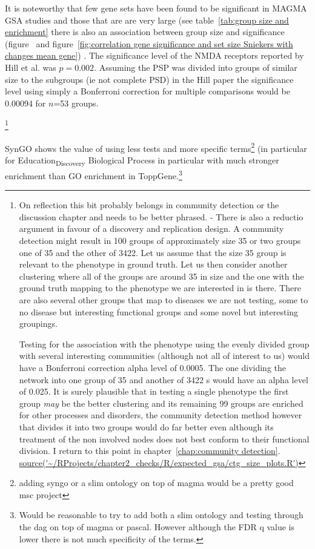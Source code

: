 It is noteworthy that few gene sets have been found to be significant in MAGMA GSA studies and those that are are very large (see table~\ref{tab:group size and enrichment} there is also an association between group size and significance (figure~\label{fig:correlation gene significance and set size Sniekers} and figure~\ref{fig:correlation gene significance and set size Sniekers with changes mean gene}) . The significance level of the NMDA receptors reported by Hill et al. \cite{hill2014human} was $p=0.002$. Assuming the PSP was divided into groups of similar size to the subgroups (ie not complete PSD) in the Hill paper the significance level using simply a Bonferroni correction for multiple comparisons would be  0.00094 for $n$=53 groups. 


\footnote{On reflection this bit probably belongs in community detection or the discussion chapter and needs to be better phrased. - There is also a reductio argument in favour of a discovery and replication design.  A community detection might result in 100 groups of approximately size 35 or two groups one of 35 and the other of 3422. Let us assume that the size 35 group is relevant to the phenotype in ground truth. Let us then consider another clustering where all of the groups are around 35 in size and the one with the ground truth mapping to the phenotype we are interested in is there. There are also several other groups that map to diseases we are not testing, some to no disease but interesting functional groups and some novel but interesting groupings. 

Testing for the association with the phenotype using the evenly divided group with several interesting communities (although not all of interest to us)  would have a Bonferroni correction alpha level of 0.0005. The one dividing the network into one group of 35 and another of 3422 s would have an alpha level of 0.025. It is surely plausible that in testing a single phenotype the first group \textit{may} be the better clustering and its remaining 99 groups are enriched for other processes and disorders, the community detection method however that divides it into two groups would do far better even although its treatment of the non involved nodes does not best conform to their functional division. I return to this point in chapter~\ref{chap:community detection}.
\url{ source('~/RProjects/chapter2_checks/R/expected_gsa/ctg_size_plots.R')}}

SynGO shows the value of using less tests and more specific terms\footnote{adding syngo or a slim ontology on top of magma would be a pretty good msc project} (in particular for Education\textsubscript{Discovery} Biological Process in particular with much stronger enrichment than GO enrichment in ToppGene.\footnote{ Would be reasonable to try to add both a slim ontology and testing through the dag on top of magma or pascal. However although the FDR q value is lower there is not much specificity of the terms. }



